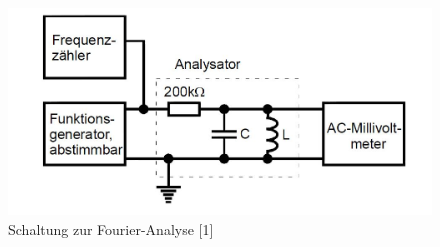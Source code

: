 	\begin{figure}[h]
		\begin{center}
		\includegraphics[scale=0.4]{picfouana.jpg}
		\caption{Schaltung zur Fourier-Analyse [1]}
		\label{picfouana}
		\end{center}	
	\end{figure}